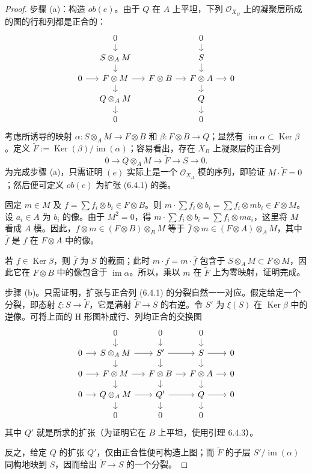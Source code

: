\begin{proof}
步骤 (a)：构造 $ob(e)$。由于 $Q$ 在 $A$ 上平坦，下列 $\mathcal O_{X_B}$ 上的凝聚层所成的图的行和列都是正合的：
\[
\begin{tikzcd}[column sep=small,row sep=small]
&0\arrow[d]&&0\arrow[d]&\\
&S\otimes_A M\arrow[d]&&S\arrow[d]&\\
0\arrow[r]&F\otimes M\arrow[r]\arrow[d]&F\otimes B\arrow[r]&F\otimes A\arrow[r]\arrow[d]&0\\
&Q\otimes_A M\arrow[d]&&Q\arrow[d]&\\
&0&&0&
\end{tikzcd}
\]
考虑所诱导的映射 $\alpha:S\otimes_A M\to F\otimes B$ 和 $\beta:F\otimes B\to Q$；显然有 $\operatorname{im}\alpha\subset\operatorname{Ker}\beta$。定义 $\widetilde F:=\operatorname{Ker}(\beta)/\operatorname{im}(\alpha)$；容易看出，存在 $X_B$ 上凝聚层的正合列
\begin{equation}
0\longrightarrow Q\otimes_A M\longrightarrow\widetilde F
\longrightarrow S\longrightarrow0.\tag{6.4.1}
\end{equation}
为完成步骤 (a)，只需证明 $(e)$ 实际上是一个 $\mathcal O_{X_A}$ 模的序列，即验证 $M\cdot\widetilde F=0$；然后便可定义 $ob(e)$ 为扩张 (6.4.1) 的类。

固定 $m\in M$ 及 $f=\sum f_i\otimes b_i\in F\otimes B$。则 $m\cdot\sum f_i\otimes b_i=\sum f_i\otimes mb_i\in F\otimes M$。设 $a_i\in A$ 为 $b_i$ 的像。由于 $M^2=0$，得 $m\cdot\sum f_i\otimes b_i=\sum f_i\otimes ma_i$，这里将 $M$ 看成 $A$ 模。因此，$f\otimes m\in(F\otimes B)\otimes_B M$ 等于 $\bar f\otimes m\in(F\otimes A)\otimes_A M$，其中 $\bar f$ 是 $f$ 在 $F\otimes A$ 中的像。

若 $f\in\operatorname{Ker}\beta$，则 $\bar f$ 为 $S$ 的截面；此时 $m\cdot f=m\cdot\bar f$ 包含于 $S\otimes_A M\subset F\otimes M$，因此它在 $F\otimes B$ 中的像包含于 $\operatorname{im}\alpha$。所以，乘以 $m$ 在 $\widetilde F$ 上为零映射，证明完成。

步骤 (b)。只需证明，扩张与正合列 (6.4.1) 的分裂自然一一对应。假定给定一个分裂，即态射 $\xi:S\to\widetilde F$，它是满射 $\widetilde F\to S$ 的右逆。令 $S'$ 为 $\xi(S)$ 在 $\operatorname{Ker}\beta$ 中的逆像。可将上面的 H 形图补成行、列均正合的交换图
\[
\begin{tikzcd}[column sep=small,row sep=small]
&0\arrow[d]&0\arrow[d]&0\arrow[d]&\\
0\arrow[r]&S\otimes_A M\arrow[r]\arrow[d]&S'\arrow[r]\arrow[d]&S\arrow[r]\arrow[d]&0\\
0\arrow[r]&F\otimes M\arrow[r]\arrow[d]&F\otimes B\arrow[r]\arrow[d]&F\otimes A\arrow[r]\arrow[d]&0\\
0\arrow[r]&Q\otimes_A M\arrow[r]\arrow[d]&Q'\arrow[r]\arrow[d]&Q\arrow[r]\arrow[d]&0\\
&0&0&0&
\end{tikzcd}
\]
其中 $Q'$ 就是所求的扩张（为证明它在 $B$ 上平坦，使用引理 6.4.3）。

反之，给定 $Q$ 的扩张 $Q'$，仅由正合性便可构造上图；而 $\widetilde F$ 的子层 $S'/\operatorname{im}(\alpha)$ 同构地映到 $S$，因而给出 $\widetilde F\to S$ 的一个分裂。
\end{proof}

